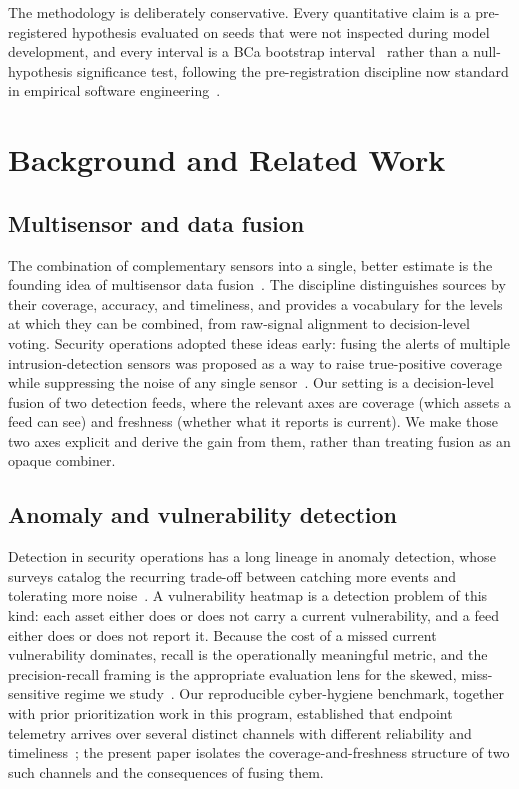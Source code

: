 \documentclass[journal]{IEEEtran}
\begin{document}
The methodology is deliberately conservative. Every quantitative claim is a pre-registered
hypothesis evaluated on seeds that were not inspected during model development, and every interval
is a BCa bootstrap interval~\cite{efron1987bca,efron1994introduction} rather than a
null-hypothesis significance test, following the pre-registration discipline now standard in
empirical software engineering~\cite{wohlin2012experimentation}.

\section{Background and Related Work}

\subsection{Multisensor and data fusion}
The combination of complementary sensors into a single, better estimate is the founding idea of
multisensor data fusion~\cite{hall1997fusion}. The discipline distinguishes sources by their
coverage, accuracy, and timeliness, and provides a vocabulary for the levels at which they can be
combined, from raw-signal alignment to decision-level voting. Security operations adopted these
ideas early: fusing the alerts of multiple intrusion-detection sensors was proposed as a way to
raise true-positive coverage while suppressing the noise of any single sensor~\cite{bass2000fusion}.
Our setting is a decision-level fusion of two detection feeds, where the relevant axes are coverage
(which assets a feed can see) and freshness (whether what it reports is current). We make those two
axes explicit and derive the gain from them, rather than treating fusion as an opaque combiner.

\subsection{Anomaly and vulnerability detection}
Detection in security operations has a long lineage in anomaly detection, whose surveys catalog the
recurring trade-off between catching more events and tolerating more noise~\cite{chandola2009anomaly}.
A vulnerability heatmap is a detection problem of this kind: each asset either does or does not
carry a current vulnerability, and a feed either does or does not report it. Because the cost of a
missed current vulnerability dominates, recall is the operationally meaningful metric, and the
precision-recall framing is the appropriate evaluation lens for the skewed, miss-sensitive regime
we study~\cite{davis2006pr}. Our reproducible cyber-hygiene benchmark, together with prior
prioritization work in this program, established that endpoint telemetry arrives over several
distinct channels with different reliability and
timeliness~\cite{paper4hygieneprio,paper1vulnprio,paper3hygienebench,paper16hygieneml}; the present paper isolates the
coverage-and-freshness structure of two such channels and the consequences of fusing them.
\end{document}
